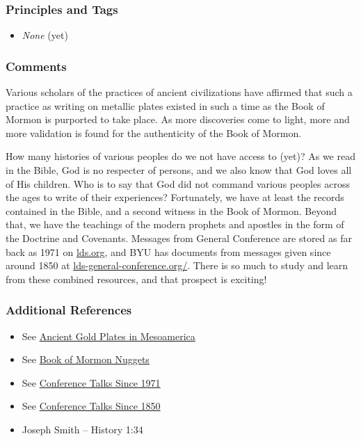 \documentclass[12pt]{report}
\begin{document}
\subsubsection{Principles and Tags\label{js:principles7}}
\begin{itemize}
\item \index{}\emph{None} (yet)
\end{itemize}

\subsubsection{Comments\label{js:comments7}}
Various scholars of the practices of ancient civilizations have affirmed that such a practice as writing on metallic plates existed in such a time as the Book of Mormon is purported to take place.  As more discoveries come to light, more and more validation is found for the authenticity of the Book of Mormon.

How many histories of various peoples do we not have access to (yet)?  As we read in the Bible, God is no respecter of persons, and we also know that God loves all of His children.  Who is to say that God did not command various peoples across the ages to write of their experiences?  Fortunately, we have at least the records contained in the Bible, and a second witness in the Book of Mormon.  Beyond that, we have the teachings of the modern prophets and apostles in the form of the Doctrine and Covenants.  Messages from General Conference are stored as far back as 1971 on \url{lds.org}, and BYU has documents from messages given since around 1850 at \url{lds-general-conference.org/}.  There is so much to study and learn from these combined resources, and that prospect is exciting!

\subsubsection{Additional References\label{js:references7}}
\begin{itemize}
\item See \href{http://www.deseretnews.com/article/705371752/Ancient-gold-plates-in-Mesoamerica.html}{Ancient Gold Plates in Mesoamerica}
\item See \href{http://www.jefflindsay.com/bme10.shtml}{Book of Mormon Nuggets}
\item See \href{https://www.lds.org/general-conference/conferences?lang=eng}{Conference Talks Since 1971}
\item See \href{http://www.lds-general-conference.org/}{Conference Talks Since 1850}
\item Joseph Smith -- History 1:34
\end{itemize}
\end{document}
